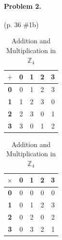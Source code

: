 \documentclass[12pt]{article}
\begin{document}
 \paragraph{Problem 2.} (p. 36 \#1b)
 \begin{table}[H]
    \caption{Addition and Multiplication in $\mathbb Z_4$}
    \vspace{2mm}
    \centering
    \begin{minipage}{.4\linewidth}
        \centering
        \begin{tabular}{|c|c|c|c|c|}
            \hline
            $+$ & \bf 0 & \bf 1 & \bf 2 & \bf 3 \\ \hline
            \bf 0 & 0 & 1 & 2 & 3 \\ \hline
            \bf 1 & 1 & 2 & 3 & 0 \\ \hline
            \bf 2 & 2 & 3 & 0 & 1 \\ \hline
            \bf 3 & 3 & 0 & 1 & 2 \\ \hline
        \end{tabular}
    \end{minipage}
    \begin{minipage}{.4\linewidth}
        \centering
        \begin{tabular}{|c|c|c|c|c|}
            \hline
            $\times$ & \bf 0 & \bf 1 & \bf 2 & \bf 3 \\ \hline
            \bf 0    &  0    &   0   &  0    &  0 \\ \hline
            \bf 1    &  0    &   1   &  2    &  3  \\ \hline
            \bf 2    &  0    &   2   &  0    &  2  \\ \hline
            \bf 3    &  0    &   3   &  2    &  1 \\ \hline
        \end{tabular}
    \end{minipage}
 \end{table}
\end{document}

